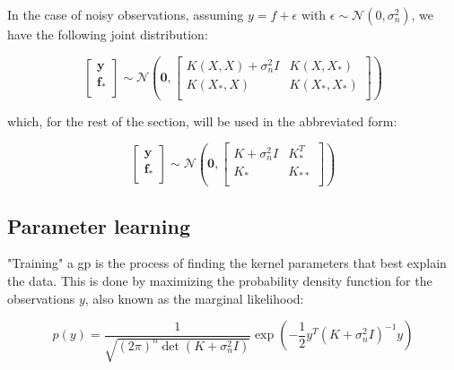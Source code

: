 In the case of noisy observations, assuming $y = f + \epsilon$  with $\epsilon
\sim \mathcal{N}(0, \sigma_n^2)$, we have the following joint distribution:

\begin{equation}
    \begin{bmatrix}
        \mathbf{y} \\
        \mathbf{f_*} \\
    \end{bmatrix} \sim
    \mathcal{N}\left(
        \mathbf{0}, 
        \begin{bmatrix}
            K(X, X) + \sigma_n^2 I& K(X, X_*) \\
            K(X_*, X) & K(X_*, X_*) \\
        \end{bmatrix}
    \right)
\end{equation}

which, for the rest of the section, will be used in the abbreviated form:

\begin{equation}
    \begin{bmatrix}
        \mathbf{y} \\
        \mathbf{f_*} \\
    \end{bmatrix} \sim
    \mathcal{N}\left(
        \mathbf{0}, 
        \begin{bmatrix}
            K + \sigma_n^2 I& K_*^T \\
            K_* & K_{**} \\
        \end{bmatrix}
    \right)
\end{equation}


\subsection{Parameter learning}

"Training" a \acrshort{gp} is the process of finding the kernel parameters that
best explain the data. This is done by maximizing the probability density
function for the observations $y$, also known as the marginal likelihood:

\begin{equation}\label{eq:gp_likelihood}
    p(y) = \frac{1}{\sqrt{(2\pi)^{n}\det{\left(K + \sigma_n^2I\right)}}}
    \exp{\left(-\frac{1}{2}y^T\left(K + \sigma_n^2I\right)^{-1}y\right)}
\end{equation}

